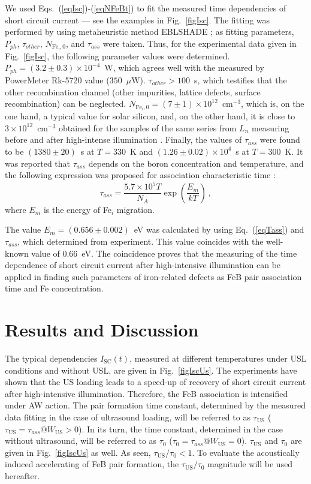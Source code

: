 \documentclass[sn-mathphys]{sn-jnl}%
\theoremstyle{thmstyleone}%
\theoremstyle{thmstyletwo}%
\theoremstyle{thmstylethree}%
\begin{document}
We used Eqs.~(\ref{eqIsc})-(\ref{eqNFeBt}) to fit the measured time dependencies of short circuit current ---
see the examples in Fig.~\ref{figIsc}.
The fitting was performed by using metaheuristic method EBLSHADE \cite{EBLSHADE};
as fitting parameters, $P_{ph}$, $\tau_{other}$, $N_\mathrm{Fe_i,0}$, and $\tau_{ass}$ were taken.
Thus, for the experimental data given in Fig.~\ref{figIsc}, the following parameter
values were determined.
$P_{ph}=(3.2\pm0.3)\times 10^{-4}$~W, which agrees well with the measured by PowerMeter Rk-5720 value
($350$~$\mu$W).
$\tau_{other}>100$~s,  which testifies that the other recombination channel
(other impurities, lattice defects, surface recombination) can be neglected.
$N_\mathrm{Fe_i,0}=(7\pm1)\times10^{12}$~cm$^{-3}$,
which is, on the one hand,
a typical value for solar silicon, and, on the other hand,
it is close to $3\times10^{12}$~cm$^{-3}$
obtained for the samples of the same series
from $L_n$ measuring before and after high-intense illumination \cite{FeB_Zong}.
Finally, the values of $\tau_{ass}$ were found
to be $(1380\pm20)$~s at $T=330$~K and $(1.26\pm0.02)\times10^4$~s at $T=300$~K.
It was reported that $\tau_{ass}$ depends on the boron concentration and temperature,
and the following expression was proposed for association characteristic time \cite{FeBAssJAP2014}:
\begin{equation}
\label{eqTass}
\tau_{ass}=\frac{5.7\times10^5T}{N_A}\exp\left(\frac{E_m}{kT}\right)\,,
\end{equation}
where
$E_m$ is the energy of Fe$_i$ migration.

The value $E_m=(0.656\pm0.002)$~eV was calculated by using Eq.~(\ref{eqTass})
and $\tau_{ass}$, which determined from experiment.
This value coincides with the well-known \cite{FeBAssJAP2014,FeBkinAPL2008} value  of 0.66~eV.
The coincidence proves that the measuring of the time dependence of short circuit current
after high-intensive illumination can be applied in finding such
parameters of iron-related defects as FeB pair association time and Fe concentration.


\section{Results and Discussion}

The typical dependencies $I_\mathrm{SC}(t)$, measured at different temperatures
under USL conditions and without USL, are given in Fig.~\ref{figIscUs}.
The experiments have shown that the US loading leads to
a speed-up of recovery of short circuit current after high-intensive illumination.
Therefore, the  FeB association is intensified under AW action.
The pair formation time constant, determined by the measured data fitting
in the case of ultrasound loading, will be referred to
as $\tau_\mathrm{US}$ ($\tau_\mathrm{US}=\tau_{ass}@W_\mathrm{US}>0$).
In its turn, the time constant, determined in the case without ultrasound,
will be referred to as $\tau_0$ ($\tau_0=\tau_{ass}@W_\mathrm{US}=0$).
$\tau_\mathrm{US}$ and $\tau_0$ are given in Fig.~\ref{figIscUs} as well.
As seen, $\tau_\mathrm{US}/\tau_{0}< 1$.
To evaluate the acoustically induced accelerating of FeB pair formation,
the $\tau_\mathrm{US}/\tau_{0}$ magnitude will be used hereafter.
\end{document}
